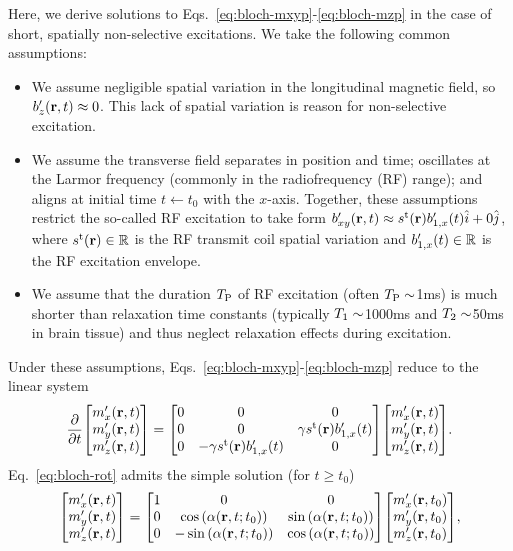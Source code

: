 Here,
we derive solutions 
to Eqs.~\eqref{eq:bloch-mxyp}-\eqref{eq:bloch-mzp}
in the case of short, spatially non-selective excitations.
We take the following common assumptions:
\begin{itemize}
	\item 
		We assume negligible spatial variation
		in the longitudinal magnetic field, 
		so $\bzp\prt \approx 0$. 
		This lack of spatial variation is reason
		for non-selective excitation.
	\item 
		We assume the transverse field
		separates in position and time;
		oscillates at the Larmor frequency
		(commonly in the radiofrequency (RF) range);
		and aligns at initial time $t \gets t_0$ 
		with the $x$-axis.
		Together,
		these assumptions restrict
		the so-called RF excitation to take form
		$\bxyp\prt \approx \stx\pr \bonexp\pt \unit{i} + 0\unit{j}$,
		where $\stx\pr \in \real$ is the RF transmit coil spatial variation
		and $\bonexp\pt \in \real$ is the RF excitation envelope.
	\item
		We assume that 
		the duration $T_\mathrm{P}$
		of RF excitation
		(often $T_\mathrm{P}\sim$1ms)
		is much shorter than relaxation time constants
		(typically $T_1\sim$1000ms and $T_2\sim$50ms
		in brain tissue)
		and thus neglect relaxation effects
		during excitation.
\end{itemize}
Under these assumptions, 
Eqs.~\eqref{eq:bloch-mxyp}-\eqref{eq:bloch-mzp}
reduce to the linear system
\begin{align}
	\dela{t}
	\begin{bmatrix}
		\mxp\prt \\
		\myp\prt \\
		\mzp\prt
	\end{bmatrix}
	=
	\begin{bmatrix}
		0 & 0 & 0 \\
		0 & 0 & \gam \stx\pr \bonexp\pt \\
		0 & -\gam \stx\pr \bonexp\pt & 0
	\end{bmatrix}
	\begin{bmatrix}
		\mxp\prt \\
		\myp\prt \\
		\mzp\prt
	\end{bmatrix}.
	\label{eq:bloch-rot}
\end{align}
Eq.~\eqref{eq:bloch-rot} admits the simple solution
(for $t\geq t_0$)
\begin{align}
	\begin{bmatrix}
		\mxp\prt \\
		\myp\prt \\
		\mzp\prt
	\end{bmatrix}
	= 
	\begin{bmatrix}
		1 & 0 & 0 \\
		0 & \cosa{\fliprt} & \sina{\fliprt} \\
		0 & -\sina{\fliprt} & \cosa{\fliprt} 
	\end{bmatrix}
	\begin{bmatrix}
		\mxp\prtz \\
		\myp\prtz \\
		\mzp\prtz
	\end{bmatrix},
	\label{eq:rot-sol}
\end{align}

